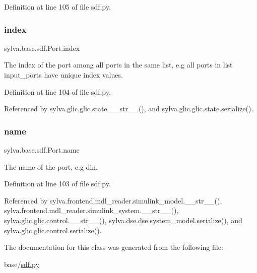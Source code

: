 Definition at line 105 of file sdf.\+py.

\mbox{\label{classsylva_1_1base_1_1sdf_1_1_port_abbfd66f762649b6a8105657259471c5a}} 
\subsubsection{\texorpdfstring{index}{index}}
{\footnotesize\ttfamily sylva.\+base.\+sdf.\+Port.\+index}



The index of the port among all ports in the same list, e.\+g all ports in list {\ttfamily input\+\_\+ports} have unique index values. 



Definition at line 104 of file sdf.\+py.



Referenced by sylva.\+glic.\+glic.\+state.\+\_\+\+\_\+str\+\_\+\+\_\+(), and sylva.\+glic.\+glic.\+state.\+serialize().

\mbox{\label{classsylva_1_1base_1_1sdf_1_1_port_aa8aa0ac5a7e375e2c0cb6e92a0b1dd20}} 
\subsubsection{\texorpdfstring{name}{name}}
{\footnotesize\ttfamily sylva.\+base.\+sdf.\+Port.\+name}



The name of the port, e.\+g {\ttfamily din}. 



Definition at line 103 of file sdf.\+py.



Referenced by sylva.\+frontend.\+mdl\+\_\+reader.\+simulink\+\_\+model.\+\_\+\+\_\+str\+\_\+\+\_\+(), sylva.\+frontend.\+mdl\+\_\+reader.\+simulink\+\_\+system.\+\_\+\+\_\+str\+\_\+\+\_\+(), sylva.\+glic.\+glic.\+control.\+\_\+\+\_\+str\+\_\+\+\_\+(), sylva.\+dse.\+dse.\+system\+\_\+model.\+serialize(), and sylva.\+glic.\+glic.\+control.\+serialize().



The documentation for this class was generated from the following file\+:\begin{DoxyCompactItemize}
\item 
base/\hyperlink{sdf_8py}{sdf.\+py}\end{DoxyCompactItemize}
